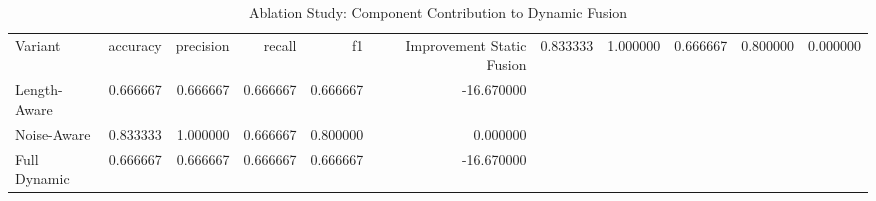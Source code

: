 \begin{table}[h!]
\centering
\caption{Ablation Study: Component Contribution to Dynamic Fusion}
\label{tab:ablation}
\begin{tabular}{lrrrrr}
\toprule
Variant & accuracy & precision & recall & f1 & Improvement %
\midrule
Static Fusion & 0.833333 & 1.000000 & 0.666667 & 0.800000 & 0.000000 \\
Length-Aware & 0.666667 & 0.666667 & 0.666667 & 0.666667 & -16.670000 \\
Noise-Aware & 0.833333 & 1.000000 & 0.666667 & 0.800000 & 0.000000 \\
Full Dynamic & 0.666667 & 0.666667 & 0.666667 & 0.666667 & -16.670000 \\
\bottomrule
\end{tabular}

\end{table}